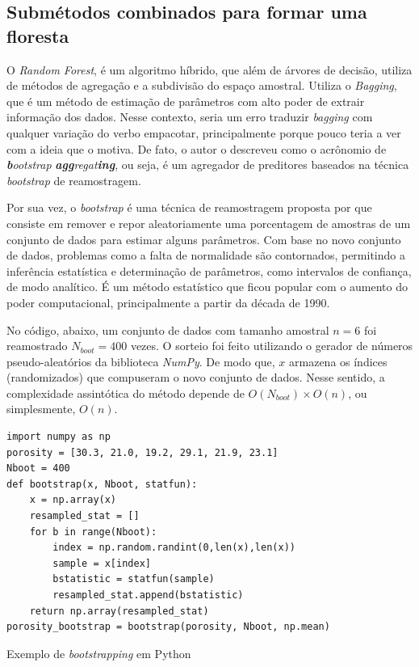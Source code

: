 \documentclass{article}
\begin{document}
\subsection{Submétodos combinados para formar uma floresta}

O \textit{Random Forest}, é um algoritmo híbrido, que além de árvores de decisão, utiliza de métodos de agregação e a subdivisão do espaço amostral. Utiliza o \textit{Bagging}, que é um método de estimação de parâmetros com alto poder de extrair informação dos dados. Nesse contexto, seria um erro traduzir \textit{bagging} com qualquer variação do verbo empacotar, principalmente porque pouco teria a ver com a ideia que o motiva. De fato, o autor \cite{Breiman_1996} o descreveu como o acrônomio de \emph{\textbf{b}ootstrap} \emph{\textbf{agg}regat\textbf{ing}}, ou seja, é um agregador de preditores baseados na técnica \textit{bootstrap} de reamostragem. 

Por sua vez, o \textit{bootstrap} é uma técnica de reamostragem proposta por \cite{Efron_1993} que consiste em remover e repor aleatoriamente uma porcentagem de amostras de um conjunto de dados para estimar alguns parâmetros. Com base no novo conjunto de dados, problemas como a falta de normalidade são contornados, permitindo a inferência estatística e determinação de parâmetros, como intervalos de confiança, de modo analítico. É um método estatístico que ficou popular com o aumento do poder computacional, principalmente a partir da década de 1990.

No código, abaixo, um conjunto de dados com tamanho amostral $n=6$ foi reamostrado $N_{boot}=400$ vezes. O sorteio foi feito utilizando o gerador de números pseudo-aleatórios da biblioteca \textit{NumPy}\cite{Harris_2020}. De modo que, $x$ armazena os índices (randomizados) que compuseram o novo conjunto de dados. Nesse sentido, a complexidade assintótica do método depende de $O(N_{boot}) \times O(n)$, ou simplesmente, $O(n)$.

\begin{listing}[!ht]
\begin{verbatim}
import numpy as np
porosity = [30.3, 21.0, 19.2, 29.1, 21.9, 23.1]
Nboot = 400
def bootstrap(x, Nboot, statfun):
    x = np.array(x)
    resampled_stat = []
    for b in range(Nboot):
        index = np.random.randint(0,len(x),len(x))
        sample = x[index]
        bstatistic = statfun(sample)
        resampled_stat.append(bstatistic)
    return np.array(resampled_stat)
porosity_bootstrap = bootstrap(porosity, Nboot, np.mean)
\end{verbatim}
\caption{Exemplo de \emph{bootstrapping} em Python}
\end{listing}
\end{document}
